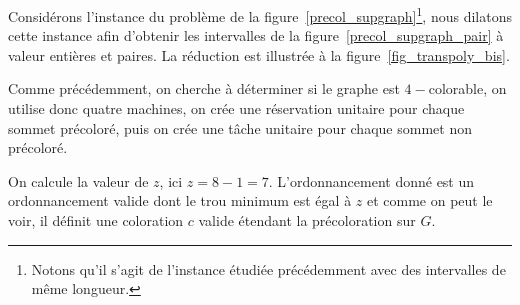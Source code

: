 \documentclass[a4paper,9pt]{report}
\begin{document}
\begin{ex}
    Considérons l'instance du problème de la figure~\ref{precol_supgraph}\footnote{Notons qu'il
    s'agit de l'instance étudiée précédemment avec des intervalles de même longueur.}, nous dilatons
    cette instance afin d'obtenir les intervalles de la figure~\ref{precol_supgraph_pair} à valeur
    entières et paires. La réduction est illustrée à la figure~\ref{fig_transpoly_bis}.

    Comme précédemment, on cherche à déterminer si le graphe est $4-$colorable, on utilise donc
    quatre machines, on crée une réservation unitaire pour chaque sommet précoloré, puis on crée une
    tâche unitaire pour chaque sommet non précoloré.

    On calcule la valeur de $z$, ici $z = 8 - 1 = 7$. L'ordonnancement donné est un ordonnancement
    valide dont le trou minimum est égal à $z$ et comme on peut le voir, il définit une coloration
    $c$ valide étendant la précoloration sur $G$.

\begin{figure}
    \begin{center}
\end{center}
\end{figure}
\end{ex}
\end{document}
